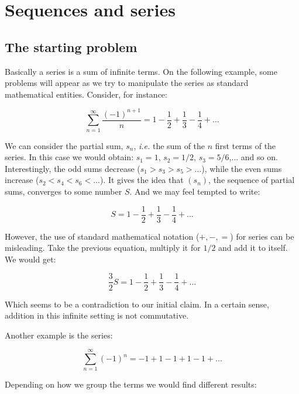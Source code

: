 \chapter{Sequences and series}

\section{The starting problem}

Basically a series is a sum of infinite terms. On the following example, some problems will appear as we try to manipulate the series as standard mathematical entities. Consider, for instance:

\begin{equation}
    \sum \limits_{n=1}^\infty \frac{(-1)^{n+1}}{n} = 1 - \frac{1}{2} + \frac{1}{3} - \frac{1}{4} + ...
\end{equation}

We can consider the partial sum, $s_n$, \emph{i.e.} the sum of the $n$ first terms of the series. In this case we would obtain: $s_1 = 1$, $s_2 = 1/2$, $s_3 = 5/6$,... and so on. Interestingly, the odd sums decrease ($s_1 > s_3 > s_5 > ...$), while the even sums increase ($s_2 < s_4 < s_6 < ...$). It gives the idea that $(s_n)$, the sequence of partial sums, converges to some number $S$. And we may feel tempted to write:

\begin{equation*}
    S = 1 - \frac{1}{2} + \frac{1}{3} - \frac{1}{4} + ...
\end{equation*}

However, the use of standard mathematical notation ($+, -, =$) for series can be misleading. Take the previous equation, multiply it for $1/2$ and add it to itself. We would get:

\begin{equation*}
    \frac{3}{2}S = 1 - \frac{1}{2} + \frac{1}{3} - \frac{1}{4} + ...
\end{equation*}

Which seems to be a contradiction to our initial claim. In a certain sense, addition in this infinite setting is not commutative.

Another example is the series:

\begin{equation}
    \sum \limits_{n=1}^\infty (-1)^n = -1 + 1 - 1 + 1 - 1 + ...
\end{equation}

Depending on how we group the terms we would find different results:

